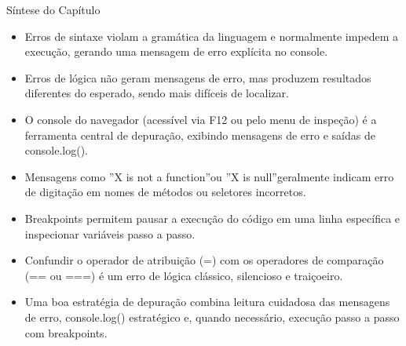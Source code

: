 Síntese do Capítulo

\begin{itemize}
  \item Erros de sintaxe violam a gramática da linguagem e normalmente impedem a execução, gerando uma mensagem de erro explícita no console.
\end{itemize}

\begin{itemize}
  \item Erros de lógica não geram mensagens de erro, mas produzem resultados diferentes do esperado, sendo mais difíceis de localizar.
\end{itemize}

\begin{itemize}
  \item O console do navegador (acessível via F12 ou pelo menu de inspeção) é a ferramenta central de depuração, exibindo mensagens de erro e saídas de console.log().
\end{itemize}

\begin{itemize}
  \item Mensagens como ”X is not a function”ou ”X is null”geralmente indicam erro de digitação em nomes de métodos ou seletores incorretos.
\end{itemize}

\begin{itemize}
  \item Breakpoints permitem pausar a execução do código em uma linha específica e inspecionar variáveis passo a passo.
\end{itemize}

\begin{itemize}
  \item Confundir o operador de atribuição (=) com os operadores de comparação (== ou ===) é um erro de lógica clássico, silencioso e traiçoeiro.
\end{itemize}

\begin{itemize}
  \item Uma boa estratégia de depuração combina leitura cuidadosa das mensagens de erro, console.log() estratégico e, quando necessário, execução passo a passo com breakpoints.
\end{itemize}
